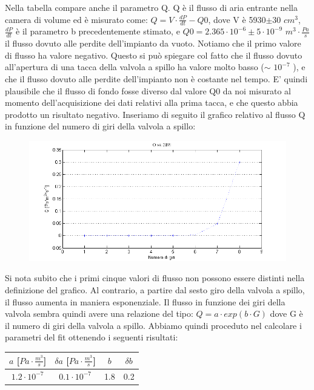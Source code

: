 \documentclass[a4paper,11pt]{article}
\begin{document}
Nella tabella compare anche il parametro Q. Q è il flusso di aria entrante nella camera di volume ed è misurato come:
$Q=V\cdot \frac{dP}{dt}-Q0$, dove V è 5930$\pm 30$ $cm^{3}$,  $\frac{dP}{dt}$ è il parametro b precedentemente stimato, e $Q0 =2.365\cdot10^{-6}\pm 5\cdot10^{-9}$ $m^{3}\cdot \frac{Pa}{s}$ il flusso dovuto alle perdite dell'impianto da vuoto.  Notiamo che il primo valore di flusso ha valore negativo. Questo si può spiegare col fatto che il flusso dovuto all'apertura di una tacca della valvola a spillo ha valore molto basso ($\sim$ $10^{-7}$ ), e che il flusso dovuto alle perdite dell'impianto non è costante nel tempo. E' quindi plausibile che il flusso di fondo fosse diverso dal valore Q0 da noi misurato al momento dell'acquisizione dei dati relativi alla prima tacca, e che questo abbia prodotto un risultato negativo. Inseriamo di seguito il grafico relativo al flusso Q in funzione del numero di giri della valvola a spillo:
 \begin{center} 
\begin{figure}[htpd]
\hspace{-57.5pt}
\includegraphics{graficoQ.png}
\end{figure}
\end{center}
Si nota subito che i primi cinque valori di flusso non possono essere distinti nella definizione del grafico. Al contrario, a partire dal sesto giro della valvola a spillo, il flusso aumenta in maniera esponenziale. Il flusso in funzione dei giri della valvola sembra quindi avere una relazione del tipo: $Q=a\cdot exp(b\cdot G)$ dove G è il numero di giri della valvola a spillo.  
Abbiamo quindi proceduto nel calcolare i parametri del fit ottenendo i seguenti risultati:

\begin{center}

\begin{tabular}{|c|c|c|c|}
\hline $a$ [$Pa\cdot \frac{m^{3}}{s}$] & $\delta a$ [$Pa\cdot \frac{m^{3}}{s}$] & $b$ & $\delta b$ \\ 
\hline  $1.2\cdot 10^{-7}$ & $0.1\cdot 10^{-7}$ & 1.8 & 0.2 \\ 
\hline 
\end{tabular}
 
\end{center}
\end{document}
